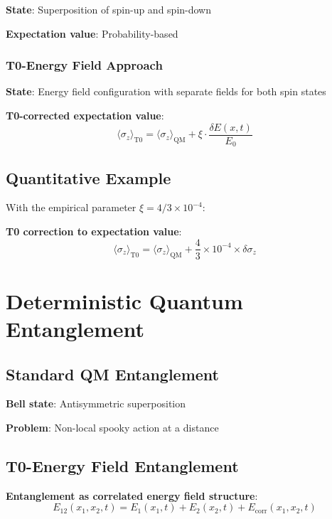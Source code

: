 \documentclass[12pt,a4paper]{article}
\newcommand{\xipar}{\xi}
\begin{document}
	\textbf{State}: Superposition of spin-up and spin-down
	
	\textbf{Expectation value}: Probability-based
	
	\subsubsection{T0-Energy Field Approach}
	
	\textbf{State}: Energy field configuration with separate fields for both spin states
	
	\textbf{T0-corrected expectation value}:
	\begin{equation}
		\boxed{\langle \sigma_z \rangle_{\mathrm{T0}} = \langle \sigma_z \rangle_{\mathrm{QM}} + \xipar \cdot \frac{\delta E(x,t)}{E_0}}
		\label{eq:corrected_spin_z}
	\end{equation}
	
	\subsection{Quantitative Example}
	
	With the empirical parameter $\xipar = 4/3 \times 10^{-4}$:
	
	\textbf{T0 correction to expectation value}:
	\begin{equation}
		\langle \sigma_z \rangle_{\mathrm{T0}} = \langle \sigma_z \rangle_{\mathrm{QM}} + \frac{4}{3} \times 10^{-4} \times \delta\sigma_z
	\end{equation}
	
	\section{Deterministic Quantum Entanglement}
	
	\subsection{Standard QM Entanglement}
	
	\textbf{Bell state}: Antisymmetric superposition
	
	\textbf{Problem}: Non-local spooky action at a distance
	
	\subsection{T0-Energy Field Entanglement}
	
	\textbf{Entanglement as correlated energy field structure}:
	\begin{equation}
		\boxed{E_{12}(x_1, x_2, t) = E_1(x_1, t) + E_2(x_2, t) + E_{\mathrm{corr}}(x_1, x_2, t)}
	\end{equation}
	
\end{document}
